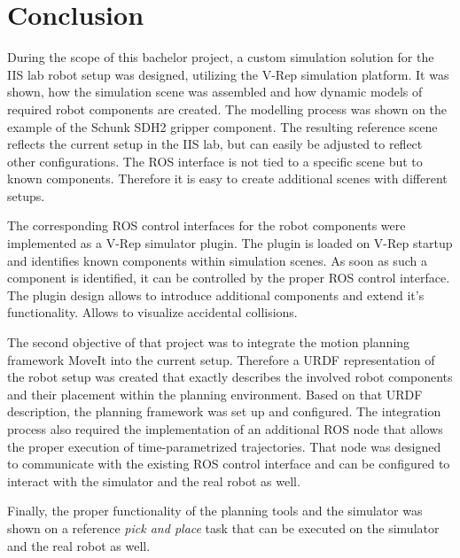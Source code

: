 
\chapter{Conclusion}

During the scope of this bachelor project, a custom simulation solution for the IIS lab robot setup was designed, utilizing the V-Rep simulation platform. It was shown, how the simulation scene was assembled and how dynamic models of required robot components are created. The modelling process was shown on the example of the Schunk SDH2 gripper component. The resulting reference scene reflects the current setup in the IIS lab, but can easily be adjusted to reflect other configurations. The ROS interface is not tied to a specific scene but to known components. Therefore it is easy to create additional scenes with different setups.

The corresponding ROS control interfaces for the robot components were implemented as a V-Rep simulator plugin. The plugin is loaded on V-Rep startup and identifies known components within simulation scenes. As soon as such a component is identified, it can be controlled by the proper ROS control interface. The plugin design allows to introduce additional components and extend it's functionality. Allows to visualize accidental collisions.

The second objective of that project was to integrate the motion planning framework MoveIt into the current setup. Therefore a URDF representation of the robot setup was created that exactly describes the involved robot components and their placement within the planning environment. Based on that URDF description, the planning framework was set up and configured. The integration process also required the implementation of an additional ROS node that allows the proper execution of time-parametrized trajectories. That node was designed to communicate with the existing ROS control interface and can be configured to interact with the simulator and the real robot as well. 

Finally, the proper functionality of the planning tools and the simulator was shown on a reference \emph{pick and place} task that can be executed on the simulator and the real robot as well.
